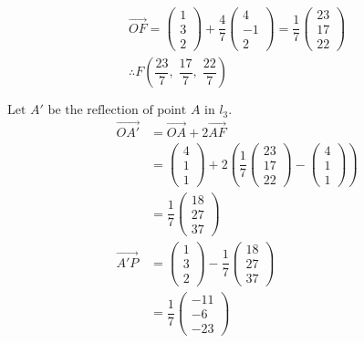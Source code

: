\documentclass[12pt, a4 paper]{article}
\begin{document}
\begin{outline}[enumerate]
					\[\begin{array}{l}\overrightarrow {OF}  = \left( {\begin{array}{*{20}{c}}1\\3\\2\end{array}} \right) + \dfrac{4}{7}\left( {\begin{array}{*{20}{c}}4\\{ - 1}\\2\end{array}} \right) = \dfrac{1}{7}\left( {\begin{array}{*{20}{c}}{23}\\{17}\\{22}\end{array}} \right)\\\therefore F\left( {\dfrac{{23}}{7},\;\dfrac{{17}}{7},\;\dfrac{{22}}{7}} \right)\end{array}\]

					${\textrm{Let }}A'{\textrm{ be the reflection of point }}A{\textrm{ in }}{l_3}.$
					\begin{align*}
						\overrightarrow {OA'} & = \overrightarrow {OA}  + 2\overrightarrow {AF} \\ &= \left( {\begin{array}{*{20}{c}}4\\1\\1\end{array}} \right) + 2\left( {\dfrac{1}{7}\left( {\begin{array}{*{20}{c}}{23}\\{17}\\{22}\end{array}} \right) - \left( {\begin{array}{*{20}{c}}4\\1\\1\end{array}} \right)} \right)\\ &= \dfrac{1}{7}\left( {\begin{array}{*{20}{c}}{18}\\{27}\\{37}\end{array}} \right)\\\overrightarrow {A'P}  &= \left( {\begin{array}{*{20}{c}}1\\3\\2\end{array}} \right) - \dfrac{1}{7}\left( {\begin{array}{*{20}{c}}{18}\\{27}\\{37}\end{array}} \right)\\ &= \dfrac{1}{7}\left( {\begin{array}{*{20}{c}}{ - 11}\\{ - 6}\\{ - 23}\end{array}} \right)
					\end{align*}


\end{outline}
\end{document}

